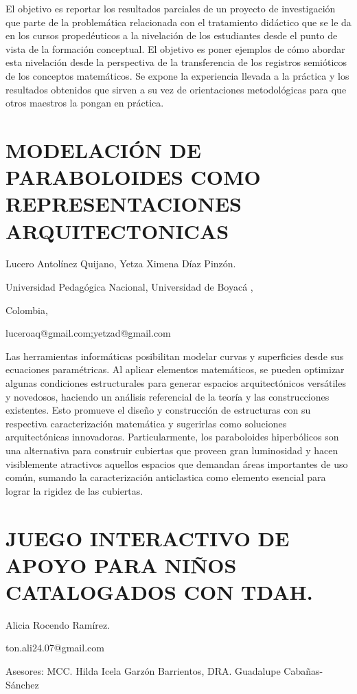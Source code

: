 El objetivo es reportar los resultados parciales de un proyecto de
investigación que parte de la problemática relacionada con el tratamiento
didáctico que se le da en los cursos propedéuticos a la nivelación
de los estudiantes desde el punto de vista de la formación conceptual.
El objetivo es poner ejemplos de cómo abordar esta nivelación desde
la perspectiva de la transferencia de los registros semióticos de
los conceptos matemáticos. Se expone la experiencia llevada a la práctica
y los resultados obtenidos que sirven a su vez de orientaciones metodológicas
para que otros maestros la pongan en práctica.


\section{MODELACIÓN DE PARABOLOIDES COMO REPRESENTACIONES ARQUITECTONICAS}

\begin{datos}

Lucero Antolínez Quijano, Yetza Ximena Díaz Pinzón.

Universidad Pedagógica Nacional, Universidad de Boyacá ,

Colombia,

luceroaq@gmail.com;yetzad@gmail.com

\end{datos}

Las herramientas informáticas posibilitan modelar curvas y superficies
desde sus ecuaciones paramétricas. Al aplicar elementos matemáticos,
se pueden optimizar algunas condiciones estructurales para generar
espacios arquitectónicos versátiles y novedosos, haciendo un análisis
referencial de la teoría y las construcciones existentes. Esto promueve
el diseño y construcción de estructuras con su respectiva caracterización
matemática y sugerirlas como soluciones arquitectónicas innovadoras.
Particularmente, los paraboloides hiperbólicos son una alternativa
para construir cubiertas que proveen gran luminosidad y hacen visiblemente
atractivos aquellos espacios que demandan áreas importantes de uso
común, sumando la caracterización anticlastica como elemento esencial
para lograr la rigidez de las cubiertas. 


\section{JUEGO INTERACTIVO DE APOYO PARA NIÑOS CATALOGADOS CON TDAH. }

\begin{datos}

Alicia Rocendo Ramírez. 

ton.ali24.07@gmail.com 

Asesores: MCC. Hilda Icela Garzón Barrientos, DRA. Guadalupe Cabañas-Sánchez

\end{datos}

